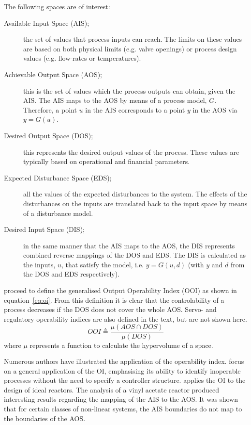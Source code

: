 \documentclass[final,authoryear,5pt,times,twocolumn]{elsarticle}
\begin{document}
The following spaces are of interest:
\begin{description}
  \item [Available Input Space (AIS);] the set of values that process      inputs can reach. 
The limits on these values are based on both physical limits (e.g.     valve openings) or process design values (e.g. flow-rates or temperatures). 
  \item [Achievable Output Space (AOS);] this is the set of values which the process outputs can obtain, given the AIS. 
The AIS maps to the AOS by means of a process model, $G$. 
Therefore, a point $u$ in the AIS corresponds to a point $y$ in the AOS via $y=G(u)$. 
  \item [Desired Output Space (DOS);] this represents the desired output values of the process. 
These values are typically based on operational and financial   parameters. 
  \item [Expected Disturbance Space (EDS);] all the values of the expected disturbances to the system. 
The effects of the disturbances on the inputs are translated back to the input space by means of a disturbance model.
  \item [Desired Input Space (DIS);] in the same manner that the AIS maps to the AOS, the DIS represents combined reverse mappings of the DOS and EDS.
The DIS is calculated as the inputs, $u$, that satisfy the model, i.e. $y=G(u,d)$ (with $y$ and $d$ from the DOS and EDS respectively).
\end{description}

\citet{vinsonartoi} proceed to define the generalised Output Operability Index (OOI) as shown in equation~\ref{eq:oi}. 
From this definition it is clear that the controlability of a process decreases if the DOS does not cover the whole AOS. 
Servo- and regulatory operability indices are also defined in the text, but are not shown here.
\begin{equation}
  \label{eq:oi}
     OOI \triangleq \frac{\mu(AOS\cap DOS)}{\mu(DOS)}
\end{equation}
where $\mu$ represents a function to calculate the hypervolume of a space.

Numerous authors have illustrated the application of the operability index. 
\citet{opconproc} focus on a general application of the OI, emphasising its ability to identify inoperable processes without the need to specify a controller structure. 
\citet{opidealrx} applies the OI to the design of ideal reactors. 
The analysis of a vinyl acetate reactor produced interesting results
regarding the mapping of the AIS to the AOS. 
It was shown that for certain classes of non-linear systems, the AIS boundaries do not map to the boundaries of the AOS.
\end{document}
